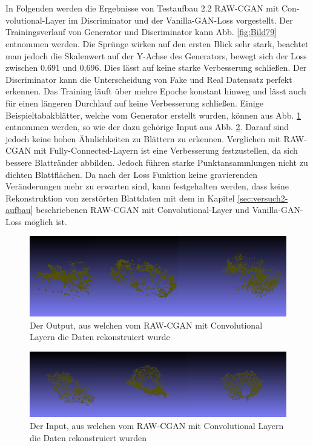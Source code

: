 \documentclass{llncs}
\begin{document}
\newpage
~\\\\
In Folgenden werden die Ergebnisse von Testaufbau 2.2 RAW-CGAN mit Con-volutional-Layer im Discriminator und der Vanilla-GAN-Loss vorgestellt. Der Trainingsverlauf von Generator und Discriminator kann Abb. \ref{fig:Bild79} entnommen werden. Die Sprünge wirken auf den ersten Blick sehr stark, beachtet man jedoch die Skalenwert auf der Y-Achse des Generators, bewegt sich der Loss zwischen 0.691 und 0,696. Dies lässt auf keine starke Verbesserung schließen. Der Discriminator kann die Unterscheidung von Fake und Real Datensatz perfekt erkennen. Das Training läuft über mehre Epoche konstant hinweg und lässt auch für einen längeren Durchlauf auf keine Verbesserung schließen. Einige Beispieltabakblätter, welche vom Generator erstellt wurden,  können aus Abb. \ref{fig:Bild80} entnommen werden, so wie der dazu gehörige Input aus Abb. \ref{fig:Bild78}. Darauf sind jedoch keine hohen Ähnlichkeiten zu Blättern zu erkennen. Verglichen mit RAW-CGAN mit Fully-Connected-Layern ist eine Verbesserung festzustellen, da sich bessere Blattränder abbilden. Jedoch führen starke Punktansammlungen nicht zu dichten Blattflächen. Da nach der Loss Funktion keine gravierenden Veränderungen mehr zu erwarten sind, kann festgehalten werden, dass keine Rekonstruktion von zerstörten Blattdaten mit dem in Kapitel \ref{sec:versuch2-aufbau} beschriebenen RAW-CGAN mit Convolutional-Layer und Vanilla-GAN-Loss möglich ist.
\begin{figure}[htbp] 
	\centering
	\includegraphics[width=1.0\textwidth]{dcpgan_ws_fake.png}
	\caption{Der Output, aus welchen vom RAW-CGAN mit Convolutional Layern die Daten rekonstruiert wurde}
	\label{fig:Bild80}
\end{figure}
\begin{figure}[htbp] 
	\centering
	\includegraphics[width=1.0\textwidth]{dc_pgan_ws_real.png}
	\caption{Der Input, aus welchen vom RAW-CGAN mit Convolutional Layern die Daten rekonstruiert wurden}
	\label{fig:Bild78}
\end{figure}
\end{document}
